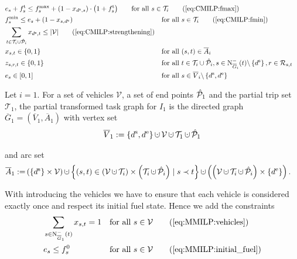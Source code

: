 \begin{align}
	& \omit\rlap{$\displaystyle{e_s + \ft_s \leq f^{\max}_s + \left(1-x_{\ds,s}\right)\cdot\left(1+\ft_s\right)} \qquad \text{for all } s\in\Ti \tag{\ref{eq:CMILP:fmax}}$} \\
	& f^{\min}_s \leq e_s + \left(1-x_{s,\de}\right) && \text{for all } s\in\Ti \tag{\ref{eq:CMILP:fmin}} \\
	& \sum_{t\in\Ti\cup\Phat_i} x_{\ds,t} \leq \vert\mathcal{V}\vert \tag{\ref{eq:CMILP:strengthening}} \\
	& x_{s,t}\in\{0,1\} & & \text{for all } (s,t)\in\overline{A}_i \label{eq:CMILP:xst} \\
	& z_{s,r,t}\in\{0,1\} & & \text{for all } t\in\Ti\cup\Phat_i,s\in\Ninoi(t)\backslash\left\{\ds\right\},r\in\Rst \label{eq:CMILP:zsrt} \\
	& e_s\in[0,1] & & \text{for all } s\in\overline{V}_i\backslash\left\{\ds,\de\right\} \label{eq:CMILP:es}
\end{align}

\newpage

\begin{definition}

Let $i=1$. For a set of vehicles $\mathcal{V}$, a set of end points $\hat{\mathcal{P}}_1$ and the partial trip set $\mathcal{T}_1$, the partial transformed task graph for $I_1$ is the directed graph $\overline{G}_1=\left(\overline{V}_1,\overline{A}_1\right)$ with vertex set
\begin{align*}
	\overline{V}_1 := \left\{\ds,\de\right\}\cupdot\mathcal{V}\cupdot\mathcal{T}_1\cupdot\Phat_1
\end{align*}

and arc set
\begin{align*}
	\overline{A}_1 := & \left(\left\{\ds\right\}\times\mathcal{V}\right)\cupdot\left\{(s,t)\in\left(\mathcal{V}\cupdot\Ti\right)\times\left(\Ti\cupdot\Phat_i\right)\mid s\prec t\right\} \cupdot\left(\left(\mathcal{V}\cupdot\Ti\cupdot\Phat_i\right)\times\left\{\de\right\}\right).
\end{align*}

\end{definition}

With introducing the vehicles we have to ensure that each vehicle is considered exactly once and respect its initial fuel state. Hence we add the constraints
\begin{align}
	& \sum_{s\in\operatorname{N}^-_{\overline{G}_1}(t)} x_{s,t} = 1 && \text{for all } s\in\mathcal{V} \tag{\ref{eq:MMILP:vehicles}} \\
	& e_s \leq f^0_s && \text{for all } s\in\mathcal{V} \tag{\ref{eq:MMILP:initial_fuel}}
\end{align}

